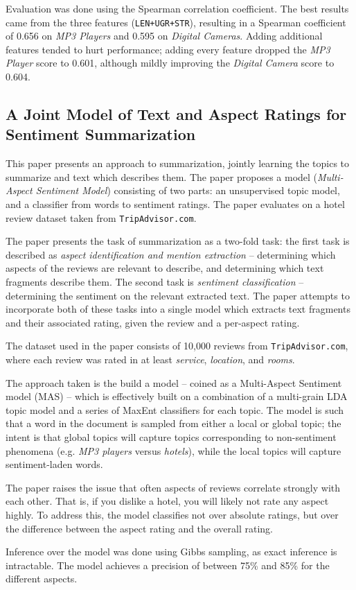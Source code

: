 \documentclass[12pt,letterpaper]{article}
\begin{document}
Evaluation was done using the Spearman correlation coefficient.
The best results came from the three features ({\tt LEN+UGR+STR}),
	resulting in a Spearman coefficient of 0.656 on {\em MP3 Players}
	and 0.595 on {\em Digital Cameras}.
Adding additional features tended to hurt performance; adding every feature
	dropped the {\em MP3 Player} score to 0.601,
	although mildly improving the {\em Digital Camera} score to 0.604.

\subsection{A Joint Model of Text and Aspect Ratings for Sentiment Summarization \cite{2008titov-summarization}}

This paper presents an approach to summarization, jointly learning the topics to summarize and text which
	describes them.
The paper proposes a model ({\em Multi-Aspect Sentiment Model}) consisting of two parts: 
	an unsupervised topic model, and a classifier from words to sentiment ratings.
The paper evaluates on a hotel review dataset taken from {\tt TripAdvisor.com}.

The paper presents the task of summarization as a two-fold task: the first task
	is described as {\em aspect identification and mention extraction} -- determining which aspects of the
	reviews are relevant to describe, and determining which text fragments describe them.
The second task is {\em sentiment classification} -- determining the sentiment on the
	relevant extracted text.
The paper attempts to incorporate both of these tasks into a single model which extracts text fragments
	and their associated rating, given the review and a per-aspect rating.

The dataset used in the paper consists of 10,000 reviews from {\tt TripAdvisor.com}, where each
review was rated in at least {\em service}, {\em location}, and {\em rooms}.

The approach taken is the build a model -- coined as a Multi-Aspect Sentiment model (MAS) --
	which is effectively built on a combination of a multi-grain LDA topic model and a series of MaxEnt
	classifiers for each topic.
The model is such that a word in the document is sampled from either a local or global topic;
	the intent is that global topics will capture topics corresponding to non-sentiment phenomena
	(e.g. {\em MP3 players} versus {\em hotels}), while the local topics will capture sentiment-laden
	words.

The paper raises the issue that often aspects of reviews correlate strongly with each other.
That is, if you dislike a hotel, you will likely not rate any aspect highly.
To address this, the model classifies not over absolute ratings, but over the difference between
	the aspect rating and the overall rating.

Inference over the model was done using Gibbs sampling, as exact inference is intractable.
The model achieves a precision of between 75\% and 85\% for the different aspects.



\end{document}
